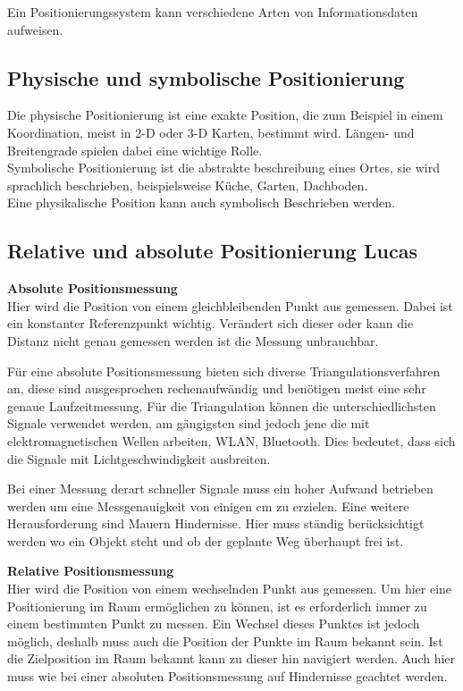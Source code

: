     Ein Positionierungssystem kann verschiedene Arten von Informationsdaten aufweisen. \cite{pos_eigenschaften}

    \subsection*{Physische und symbolische Positionierung}
    Die physische Positionierung ist eine exakte Position, die zum Beispiel in einem Koordination, meist in 2-D oder 3-D Karten, bestimmt wird. Längen- und Breitengrade spielen dabei eine wichtige Rolle.\\
    Symbolische Positionierung ist die abstrakte beschreibung eines Ortes, sie wird sprachlich beschrieben, beispielsweise Küche, Garten, Dachboden.\\
    Eine physikalische Position kann auch symbolisch Beschrieben werden.
    
    \subsection*{Relative und absolute Positionierung Lucas}
    \textbf{Absolute Positionsmessung}\\
    Hier wird die Position von einem gleichbleibenden Punkt aus gemessen. Dabei ist ein konstanter Referenzpunkt wichtig.
    Verändert sich dieser oder kann die Distanz nicht genau gemessen werden ist die Messung unbrauchbar.

    Für eine absolute Positionsmessung bieten sich diverse Triangulationsverfahren an,
    diese sind ausgesprochen rechenaufwändig und benötigen meist eine sehr genaue Laufzeitmessung.
    Für die Triangulation können die unterschiedlichsten Signale verwendet werden, am gängigsten sind jedoch jene die mit elektromagnetischen Wellen arbeiten,
    \zB WLAN, Bluetooth. Dies bedeutet, dass sich die Signale mit Lichtgeschwindigkeit ausbreiten.

    Bei einer Messung derart schneller Signale muss ein hoher Aufwand betrieben werden um eine Messgenauigkeit von einigen cm zu erzielen.
    Eine weitere Herausforderung sind Mauern \bzw Hindernisse. Hier muss ständig berücksichtigt werden wo ein Objekt steht und ob der geplante Weg überhaupt frei ist.

    \textbf{Relative Positionsmessung}\\
    Hier wird die Position von einem wechselnden Punkt aus gemessen. Um hier eine Positionierung im Raum ermöglichen zu können,
    ist es erforderlich immer zu einem bestimmten Punkt zu messen. Ein Wechsel dieses Punktes ist jedoch möglich,
    deshalb muss auch die Position der Punkte im Raum bekannt sein. Ist die Zielposition im Raum bekannt kann zu dieser hin navigiert werden.
    Auch hier muss wie bei einer absoluten Positionsmessung auf Hindernisse geachtet werden.


